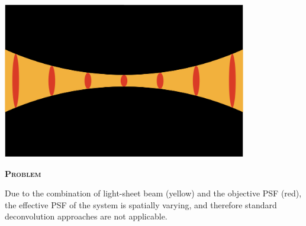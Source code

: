 \documentclass[a0paper,portrait,fontscale=0.35]{baposter}
\newcommand{\mycaption}[1]{
  {
    \smaller
    \emph{#1}
  }
}
\theoremstyle{plain}
\theoremstyle{plain}
\theoremstyle{definition}
\theoremstyle{plain}
\theoremstyle{definition}
\begin{document}
\begin{poster}
{\begin{minipage}[t]{\textwidth}
\begin{minipage}[t]{0.48\textwidth}
      \begin{minipage}[t]{\textwidth}
        \centering
        \includegraphics[width=0.8\textwidth]{img/psf_4.png}

      \end{minipage}

      \begin{center}
        \larger
        {\color{red}\textbf{\textsc{Problem}}}\\
      \end{center}
      \vspace{-0.5em}
      \begin{tcolorbox}[colback=red!10!white,colframe=red]
        Due to the combination of light-sheet beam (yellow) 
        and the objective PSF (red), 
        the effective PSF of the system is spatially varying, and
        therefore standard deconvolution approaches are not applicable.
      \end{tcolorbox}

    \end{minipage}
  \end{minipage}
}
\end{poster}
\end{document}

